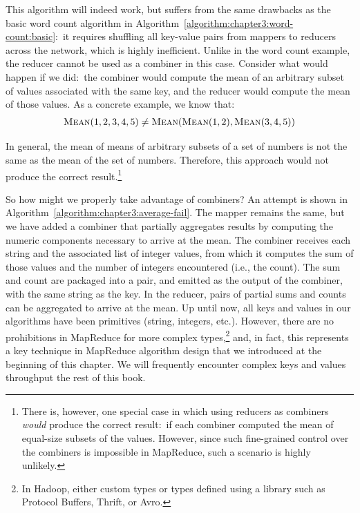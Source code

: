 This algorithm will indeed work, but suffers from the same drawbacks
as the basic word count algorithm in
Algorithm~\ref{algorithm:chapter3:word-count:basic}:\ it requires shuffling
all key-value pairs from mappers to reducers across the network, which
is highly inefficient.  Unlike in the word count example, the reducer
cannot be used as a combiner in this case.  Consider what would happen
if we did:\ the combiner would compute the mean of an arbitrary subset
of values associated with the same key, and the reducer would compute
the mean of those values.  As a concrete example, we know that:
\begin{align}
\textsc{Mean}(1, 2, 3, 4, 5) \ne \textsc{Mean}( \textsc{Mean}(1, 2), \textsc{Mean}(3, 4, 5))
\end{align}

\noindent In general, the mean of means of arbitrary subsets of a set
of numbers is not the same as the mean of the set of numbers.
Therefore, this approach would not produce the correct
result.\footnote{There is, however, one special case in which using
  reducers as combiners \emph{would} produce the correct result:\ if
  each combiner computed the mean of equal-size subsets of the values.
  However, since such fine-grained control over the combiners is
  impossible in MapReduce, such a scenario is highly unlikely.}

So how might we properly take advantage of combiners?  An attempt is
shown in Algorithm~\ref{algorithm:chapter3:average-fail}.  The mapper
remains the same, but we have added a combiner that partially
aggregates results by computing the numeric components necessary to
arrive at the mean.  The combiner receives each string and the
associated list of integer values, from which it computes the sum of
those values and the number of integers encountered (i.e., the count).
The sum and count are packaged into a pair, and emitted as the output
of the combiner, with the same string as the key.  In the reducer,
pairs of partial sums and counts can be aggregated to arrive at the
mean.  Up until now, all keys and values in our algorithms have been
primitives (string, integers, etc.).  However, there are no
prohibitions in MapReduce for more complex types,\footnote{In Hadoop,
  either custom types or types defined using a library such as
  Protocol Buffers, Thrift, or Avro.} and, in fact, this represents a
key technique in MapReduce algorithm design that we introduced at the
beginning of this chapter.  We will frequently encounter complex keys
and values throughput the rest of this book.

